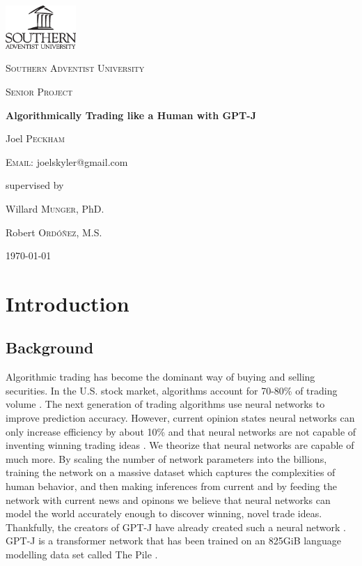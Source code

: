 \documentclass[conference]{IEEEtran}
\begin{document}
\begin{titlepage}
	\centering
	\includegraphics[width=0.2\textwidth]{logoBlackV.eps}\par
	\vspace{1.5cm}
	{\scshape\LARGE Southern Adventist University \par}
	\vfill
	{\scshape\Large Senior Project\par}
	\vspace{1cm}
	{\huge\bfseries Algorithmically Trading like a Human with GPT-J\par}
	\vspace{1cm}
	{\large Joel \textsc{Peckham}\par}
	\textsc{Email:} joelskyler@gmail.com\par
	
	\vspace{0.5cm}
	supervised by\par
	Willard \textsc{Munger}, PhD.\par
	Robert \textsc{Ordóñez}, M.S.
	\vfill
	\begin{abstract}
		\lipsum[1]
	\end{abstract}
	
	\vfill
	
	{\large \today\par}
\end{titlepage}
\onecolumn
\tableofcontents
\listoffigures
\listoftables
\twocolumn

\section{Introduction}
\subsection{Background}
Algorithmic trading has become the dominant way of buying and selling securities. In the U.S. stock market, algorithms account for 70-80\% of trading volume \cite{Samuelsson2021}. The next generation of trading algorithms use neural networks to improve prediction accuracy. However, current opinion states neural networks can only increase efficiency by about 10\% and that neural networks are not capable of inventing winning trading ideas \cite{Vonko2021}. We theorize that neural networks are capable of much more. By scaling the number of network parameters into the billions, training the network on a massive dataset which captures the complexities of human behavior, and then making inferences from current  and by feeding the network with current news and opinons we believe that neural networks can model the world accurately enough to discover winning, novel trade ideas. Thankfully, the creators of GPT-J have already created such a neural network \cite{mesh-transformer-jax}. GPT-J is a transformer network \cite{Vaswani2017} that has been trained on an 825GiB language modelling data set called The Pile \cite{Gao2021}. 
\end{document}
